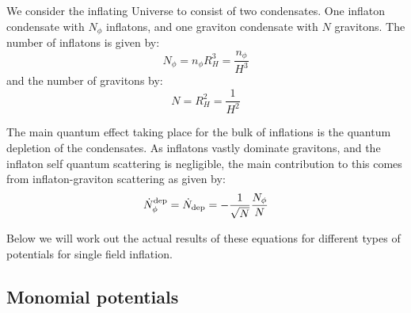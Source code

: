 We consider the inflating Universe to consist of two condensates. One inflaton condensate with $N_\phi$ inflatons, and one graviton condensate with $N$ gravitons. The number of inflatons is given by:
\begin{equation}
   N_\phi = n_\phi R_H^3 = \frac{n_\phi}{H^3}
\end{equation}
and the number of gravitons by:
\begin{equation}
	N = R_H^2 = \frac{1}{H^2}
\end{equation}

The main quantum effect taking place for the bulk of inflations is the quantum depletion of the condensates. As inflatons vastly dominate gravitons, and the inflaton self quantum scattering is negligible, the main contribution to this comes from inflaton-graviton scattering as given by:
\begin{equation}
   \dot{N}_\phi^{\rm dep} = \dot{N}_{\rm dep} = - \frac{1}{\sqrt{N}}\frac{N_{\phi}}{N}
\end{equation}

Below we will work out the actual results of these equations for different types of potentials for single field inflation.

\subsection{Monomial potentials}

